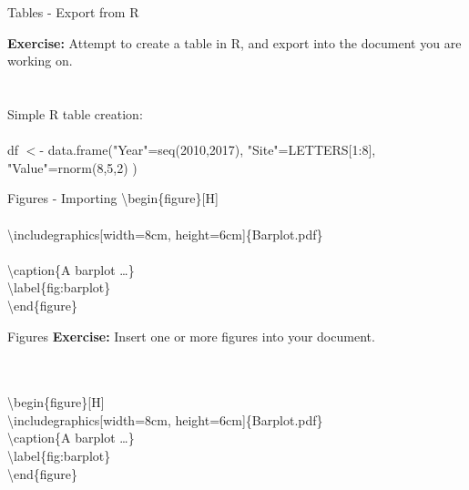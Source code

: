 \documentclass[xcolor=dvipsnames]{beamer}
\begin{document}
\begin{frame}{\LARGE{Tables - Export from R}}

{\Large \textbf{Exercise:} Attempt to create a table in R, and export into the document you are working on.}\\
\hrulefill ~\\~\\

Simple R table creation:\\~\\

df $<$- data.frame("Year"=seq(2010,2017), "Site"=LETTERS[1:8], "Value"=rnorm(8,5,2) )

\end{frame}

\begin{frame}{\LARGE{Figures - Importing}}
 \textbackslash begin\{figure\}[H]\\~\\
 \textbackslash includegraphics[width=8cm, height=6cm]\{Barplot.pdf\}\\~\\
 
 
     \textbackslash caption\{A barplot \dots\}~\\
            \textbackslash label\{fig:barplot\}~\\
         \textbackslash end\{figure\} ~\\
         
\end{frame}         

\begin{frame}{\LARGE{Figures}}
\Large{\textbf{Exercise:} Insert one or more figures into your document.}\\
\hrulefill ~\\~\\

\normalsize

 \textbackslash begin\{figure\}[H]\\
 \textbackslash includegraphics[width=8cm, height=6cm]\{Barplot.pdf\}\\
     \textbackslash caption\{A barplot \dots\}~\\
            \textbackslash label\{fig:barplot\}~\\
         \textbackslash end\{figure\} ~\\

\end{frame}
\end{document}
